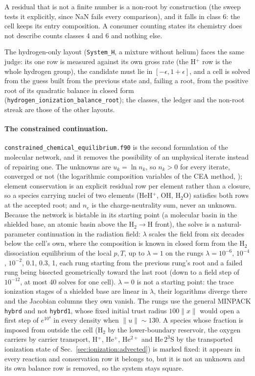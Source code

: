 A residual that is not a finite number is a non-root by construction
(the sweep tests it explicitly, since NaN fails every comparison), and it
falls in class 6: the cell keeps its entry composition. A consumer counting
states its chemistry does not describe counts classes 4 and 6 and nothing
else.

The hydrogen-only layout (\texttt{System\_H}, a mixture without helium)
faces the same judge: its one row is measured against its own gross rate
(the H$^+$ row is the whole hydrogen group), the candidate must lie in
$[-\epsilon,1+\epsilon]$, and a cell is solved from the guess built from the
previous state and, failing a root, from the positive root of its quadratic
balance in closed form (\texttt{hydrogen\_ionization\_balance\_root}); the
classes, the ledger and the non-root streak are those of the other layouts.

\paragraph{The constrained continuation.}
\texttt{constrained\_chemical\_equilibrium.f90} is the second formulation of
the molecular network, and it removes the possibility of an unphysical
iterate instead of repairing one. The unknowns are $u_k = \ln n_k$, so
$n_k>0$ for every iterate, converged or not (the logarithmic composition
variables of the CEA method, \citealt{Gordon1994}); element
conservation is an explicit residual row per element rather than a closure,
so a species carrying nuclei of two elements (HeH$^+$, OH, H$_2$O) satisfies
both rows at the accepted root; and $n_e$ is the charge-neutrality sum, never
an unknown. Because the network is bistable in its starting point (a
molecular basin in the shielded base, an atomic basin above the H$_2\to$H
front), the solve is a natural-parameter continuation \citep{Allgower2003} in the
radiation field:
$\lambda$ scales the field from six decades below the cell's own, where the
composition is known in closed form from the H$_2$ dissociation equilibrium
of the local $p,T$, up to $\lambda=1$ on the rungs $\lambda = 10^{-6}$,
$10^{-4}$, $10^{-2}$, 0.1, 0.3, 1, each rung starting from the previous
rung's root and a failed rung being bisected geometrically toward the last
root (down to a field step of $10^{-12}$, at most 40 solves for one cell).
$\lambda=0$ is not a starting point: the trace ionization stages of a shielded
base are linear in $\lambda$, their logarithms diverge there and the
Jacobian columns they own vanish. The rungs use the
general MINPACK \texttt{hybrd} and not \texttt{hybrd1}, whose fixed initial
trust radius $100\|x\|$ would open a first step of $e^{10^{4}}$ in every
density when $\|u\|\sim130$. A species whose fraction is imposed from outside
the cell (H$_2$ by the lower-boundary reservoir, the oxygen carriers by
carrier transport, H$^+$, He$^+$, He$^{2+}$ and He\,$2^3$S by the transported
ionization state of Sec.~\ref{sec:ionization:advected}) is marked fixed: it
appears in every reaction and conservation row it belongs to, but it is not an
unknown and its own balance row is removed, so the system stays square.

